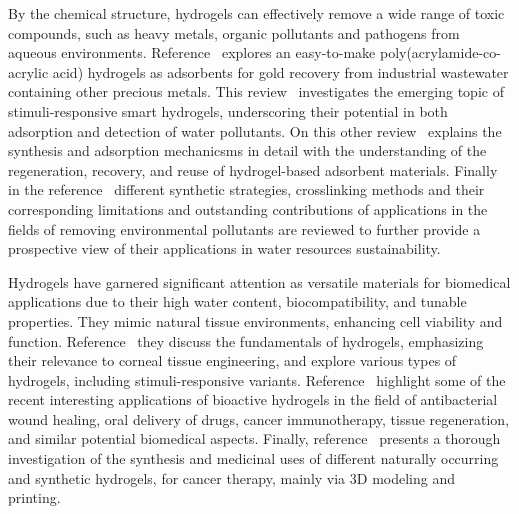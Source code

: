 By the chemical structure, hydrogels can effectively remove a wide range of toxic compounds, such as heavy metals, organic pollutants and pathogens from aqueous environments.
Reference~\citep{cinfrigniniGoldRushDesigning2024} explores an easy-to-make poly(acrylamide-co-acrylic acid) hydrogels as adsorbents for gold recovery from industrial wastewater containing other precious metals.
This review~\citep{randoFunctionalBioBasedPolymeric2024} investigates the emerging topic of stimuli-responsive smart hydrogels, underscoring their potential in both adsorption and detection of water pollutants.
On this other review~\citep{darbanHydrogelBasedAdsorbentMaterial2022a} explains the synthesis and adsorption mechanicsms in detail with the understanding of the regeneration, recovery, and reuse of hydrogel-based adsorbent materials.
Finally in the reference~\citep{songSynthesisHydrogelsTheir2022} different synthetic strategies, crosslinking methods and their corresponding limitations and outstanding contributions of applications in the fields of removing environmental pollutants are reviewed to further provide a prospective view of their applications in water resources sustainability.

Hydrogels have garnered significant attention as versatile materials for biomedical applications due to their high water content, biocompatibility, and tunable properties. 
They mimic natural tissue environments, enhancing cell viability and function.
Reference~\citep{wuAdvancementsHydrogelsCorneal2024} they discuss the fundamentals of hydrogels, emphasizing their relevance to corneal tissue engineering, and explore various types of hydrogels, including stimuli-responsive variants.
Reference~\citep{kaurHydrogelsPotentialBiomaterial2024} highlight some of the recent interesting applications of bioactive hydrogels in the field of antibacterial wound healing, oral delivery of drugs, cancer immunotherapy, tissue regeneration, and similar potential biomedical aspects.
Finally, reference~\citep{thummaIntroductionClassificationApplications2025} presents a thorough investigation of the synthesis and medicinal uses of different naturally occurring and synthetic hydrogels, for cancer therapy, mainly via 3D modeling and printing.

